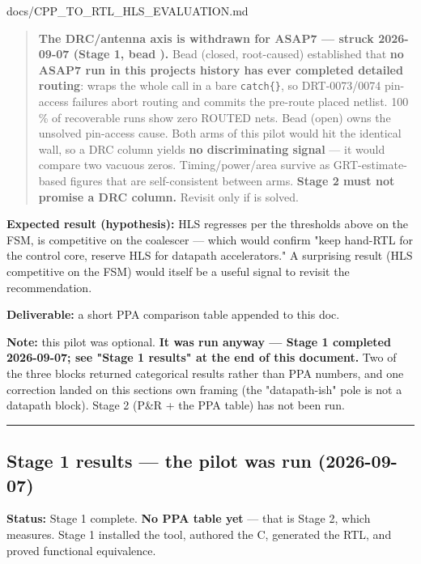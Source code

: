 \begin{relocated}{docs/CPP_TO_RTL_HLS_EVALUATION.md}
\begin{quote}
\textbf{\warn{} The DRC/\allowbreak{}antenna axis is withdrawn for ASAP7
--- struck 2026-09-07 (Stage 1, bead ).} Bead 
(closed, root-caused) established that \textbf{no ASAP7 run in this
project\textquotesingle s history has ever completed detailed routing}:
 wraps the whole
 call in a bare \texttt{catch\{\}}, so
DRT-0073/\allowbreak{}0074 pin-access failures abort routing and
 commits the pre-route placed netlist. 100 \% of
recoverable runs show zero ROUTED nets. Bead  (open) owns the
unsolved pin-access cause. Both arms of this pilot would hit the
identical wall, so a DRC column yields \textbf{no discriminating signal}
--- it would compare two vacuous zeros.
Timing/\allowbreak{}power/\allowbreak{}area survive as
GRT-estimate-based figures that are self-consistent between arms.
\textbf{Stage 2 must not promise a DRC column.} Revisit only if
 is solved.
\end{quote}

\textbf{Expected result (hypothesis):} HLS regresses per the thresholds
above on the FSM, is competitive on the coalescer --- which would
confirm "keep hand-RTL for the control core, reserve HLS for datapath
accelerators." A surprising result (HLS competitive on the FSM) would
itself be a useful signal to revisit the recommendation.

\textbf{Deliverable:} a short PPA comparison table appended to this doc.

\textbf{Note:} this pilot was optional. \textbf{It was run anyway ---
Stage 1 completed 2026-09-07; see "Stage 1 results" at the end of this
document.} Two of the three blocks returned categorical results rather
than PPA numbers, and one correction landed on this
section\textquotesingle s own framing (the "datapath-ish" pole is not a
datapath block). Stage 2 (P\&R + the PPA table) has not been run.

\begin{center}\rule{0.5\linewidth}{0.5pt}\end{center}

\subsection{Stage 1 results --- the pilot was run (2026-09-07)}\label{tm:dec:cpp-to-rtl-hls-evaluation:stage-1-results-the-pilot-was-run-2026-09-07}

\textbf{Status:} Stage 1 complete. \textbf{No PPA table yet} --- that is
Stage 2, which measures. Stage 1 installed the tool, authored the C,
generated the RTL, and proved functional equivalence.


\end{relocated}
